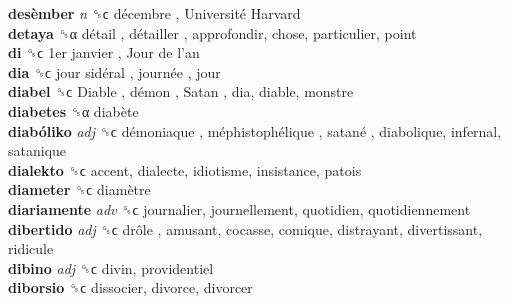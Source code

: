 \textbf{desèmber} \emph{n}  ␝ϲ   décembre ,  Université Harvard   \\
\textbf{detaya} ␝α   détail ,  détailler , approfondir, chose, particulier, point  \\
\textbf{di} ␝ϲ   1er janvier ,  Jour de l’an   \\
\textbf{dia} ␝ϲ   jour sidéral ,  journée , jour  \\
\textbf{diabel} ␝ϲ   Diable ,  démon ,  Satan , dia, diable, monstre  \\
\textbf{diabetes} ␝α   diabète   \\
\textbf{diabóliko} \emph{adj}  ␝ϲ   démoniaque ,  méphistophélique ,  satané , diabolique, infernal, satanique  \\
\textbf{dialekto} ␝ϲ  accent, dialecte, idiotisme, insistance, patois  \\
\textbf{diameter} ␝ϲ   diamètre   \\
\textbf{diariamente} \emph{adv}  ␝ϲ  journalier, journellement, quotidien, quotidiennement  \\
\textbf{dibertido} \emph{adj}  ␝ϲ   drôle , amusant, cocasse, comique, distrayant, divertissant, ridicule  \\
\textbf{dibino} \emph{adj}  ␝ϲ  divin, providentiel  \\
\textbf{diborsio} ␝ϲ  dissocier, divorce, divorcer  \\
